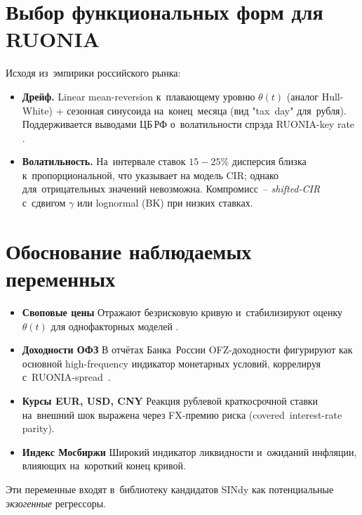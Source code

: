 \section{Выбор функциональных форм для RUONIA}

Исходя из эмпирики российского рынка:

\begin{itemize}
      \item \textbf{Дрейф.} Linear mean-reversion к плавающему
        уровню $\theta(t)$ (аналог Hull-White) +
        сезонная синусоида на конец месяца (вид "tax day" для рубля).
        Поддерживается выводами ЦБ РФ о волатильности спрэда
        RUONIA-key rate \cite{BoRTrans2024}.

      \item \textbf{Волатильность.}
        На интервале ставок $15\!-\!25\%$ дисперсия близка к пропорциональной,
        что указывает на модель CIR; однако для отрицательных
        значений невозможна.  
        Компромисс -- \emph{shifted-CIR} с сдвигом $\gamma$
        или lognormal (BK) при низких ставках.
\end{itemize}


\section{Обоснование наблюдаемых переменных}

\begin{itemize}
  \item \textbf{Своповые цены}  Отражают безрисковую кривую
        и стабилизируют оценку $\theta(t)$
        для однофакторных моделей \cite{HullWhite1990}.
  \item \textbf{Доходности ОФЗ}  В отчётах Банка России
        OFZ-доходности фигурируют как основной
        high-frequency индикатор монетарных условий,
        коррелируя с RUONIA-spread \cite{BoRTrans2024}.
  \item \textbf{Курсы EUR, USD, CNY}  Реакция рублевой
        краткосрочной ставки на внешний шок
        выражена через FX-премию риска (covered interest-rate parity).
  \item \textbf{Индекс Мосбиржи}  Широкий индикатор
        ликвидности и ожиданий инфляции,
        влияющих на короткий конец кривой.
\end{itemize}

Эти переменные входят в библиотеку кандидатов
SINdy как потенциальные \emph{экзогенные} регрессоры.

